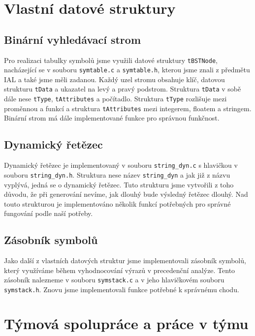\documentclass[a4paper, 11pt]{article}
\begin{document}
    \section{Vlastní datové struktury}
    
    \subsection{Binární vyhledávací strom}
    
    Pro realizaci tabulky symbolů jsme využili datové struktury \texttt{tBSTNode}, nacházející se v souboru \texttt{symtable.c} a \texttt{symtable.h}, kterou jsme znali z předmětu IAL a také jsme měli zadanou. Každý uzel stromu obsahuje klíč, datovou strukturu \texttt{tData} a ukazatel na levý a pravý podstrom. Struktura \texttt{tData} v sobě dále nese \texttt{tType}, \texttt{tAttributes} a počítadlo. Struktura \texttt{tType} rozlišuje mezi proměnnou a funkcí a struktura \texttt{tAttributes} mezi integerem, floatem a stringem. Binární strom má dále implementované funkce pro správnou funkčnost.
    
    \subsection{Dynamický řetězec} 
    
    Dynamický řetězec je implementovaný v souboru \texttt{string\_dyn.c} s hlavičkou v souboru \texttt{string\_dyn.h}. Struktura nese název \texttt{string\_dyn} a jak již z názvu vyplývá, jedná se o dynamický řetězec. Tuto strukturu jsme vytvořili z toho důvodu, že při generování nevíme, jak dlouhý bude výsledný řetězec dlouhý. Nad touto strukturou je implementováno několik funkcí potřebných pro správné fungování podle naší potřeby.
    
    \subsection{Zásobník symbolů}
    
    Jako další z vlastních datových struktur jsme implementovali zásobník symbolů, který využíváme během vyhodnocování výrazů v precedenční analýze. Tento zásobník nalezneme v souboru \texttt{symstack.c} a v jeho hlavičkovém souboru \texttt{symstack.h}. Znovu jsme implementovali funkce potřebné k správnému chodu.
    
    \section{Týmová spolupráce a práce v týmu}
    
\end{document}
